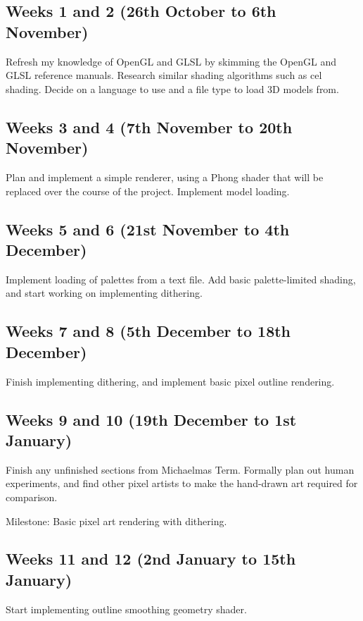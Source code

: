 \documentclass[12pt,twoside,notitlepage]{report}
\begin{document}
\subsection*{Weeks 1 and 2 (26th October to 6th November)}

Refresh my knowledge of OpenGL and GLSL by skimming the OpenGL and GLSL reference manuals. Research similar shading algorithms such as cel shading. Decide on a language to use and a file type to load 3D models from.

\subsection*{Weeks 3 and 4 (7th November to 20th November)}

Plan and implement a simple renderer, using a Phong shader that will be replaced over the course of the project. Implement model loading.

\subsection*{Weeks 5 and 6 (21st November to 4th December)}

Implement loading of palettes from a text file. Add basic palette-limited shading, and start working on implementing dithering.

\subsection*{Weeks 7 and 8 (5th December to 18th December)}

Finish implementing dithering, and implement basic pixel outline rendering.

\subsection*{Weeks 9 and 10 (19th December to 1st January)}

Finish any unfinished sections from Michaelmas Term. Formally plan out human experiments, and find other pixel artists to make the hand-drawn art required for comparison.

Milestone: Basic pixel art rendering with dithering.

\subsection*{Weeks 11 and 12 (2nd January to 15th January)}

Start implementing outline smoothing geometry shader.
\end{document}
